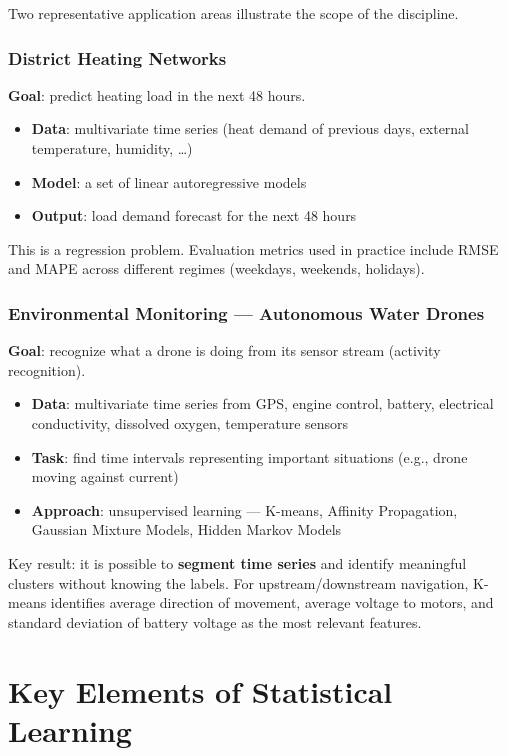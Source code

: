 \documentclass[11pt,a4paper]{article}
\theoremstyle{definition}
\theoremstyle{plain}
\theoremstyle{remark}
\begin{document}
Two representative application areas illustrate the scope of the discipline.

\subsubsection{District Heating Networks}

\textbf{Goal}: predict heating load in the next 48 hours.
\begin{itemize}
    \item \textbf{Data}: multivariate time series (heat demand of previous days, external temperature, humidity, \ldots)
    \item \textbf{Model}: a set of linear autoregressive models
    \item \textbf{Output}: load demand forecast for the next 48 hours
\end{itemize}
This is a regression problem. Evaluation metrics used in practice include RMSE and MAPE across different regimes (weekdays, weekends, holidays).

\subsubsection{Environmental Monitoring — Autonomous Water Drones}

\textbf{Goal}: recognize what a drone is doing from its sensor stream (activity recognition).
\begin{itemize}
    \item \textbf{Data}: multivariate time series from GPS, engine control, battery, electrical conductivity, dissolved oxygen, temperature sensors
    \item \textbf{Task}: find time intervals representing important situations (e.g., drone moving against current)
    \item \textbf{Approach}: unsupervised learning — K-means, Affinity Propagation, Gaussian Mixture Models, Hidden Markov Models
\end{itemize}
Key result: it is possible to \textbf{segment time series} and identify meaningful clusters without knowing the labels. For upstream/downstream navigation, K-means identifies average direction of movement, average voltage to motors, and standard deviation of battery voltage as the most relevant features.


\section{Key Elements of Statistical Learning}
\end{document}
